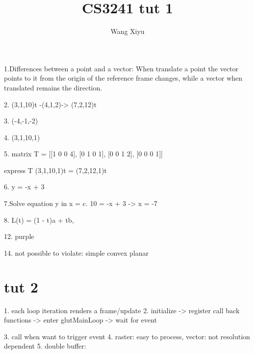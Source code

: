 \documentclass[a4paper]{article}
\begin{document}
\title{CS3241 tut 1}
\author{
  Wang Xiyu
}
\maketitle
1.Differences between a point and a vector: 
When translate a point the vector points to it from the origin of the reference frame changes, while a vector when translated remains the direction.

2. (3,1,10)t -(4,1,2)-> (7,2,12)t

3. (-4,-1,-2)

4. (3,1,10,1)

5. matrix T = 
[[1 0 0 4],
[0 1 0 1],
[0 0 1 2],
[0 0 0 1]]

express T (3,1,10,1)t = (7,2,12,1)t

6. y = -x + 3

7.Solve equation y in x = c.
10 = -x + 3 -> x = -7

8. L(t) = (1 - t)a + tb, 

12. purple

14. not possible to violate:
simple
convex 
planar


\section{tut 2}

1. each loop iteration renders a frame/update
2. initialize -> register call back functions -> enter glutMainLoop -> wait for event 

3. call when want to trigger event
4. raster: easy to process, vector: not resolution dependent
5. double buffer: 
\end{document}
